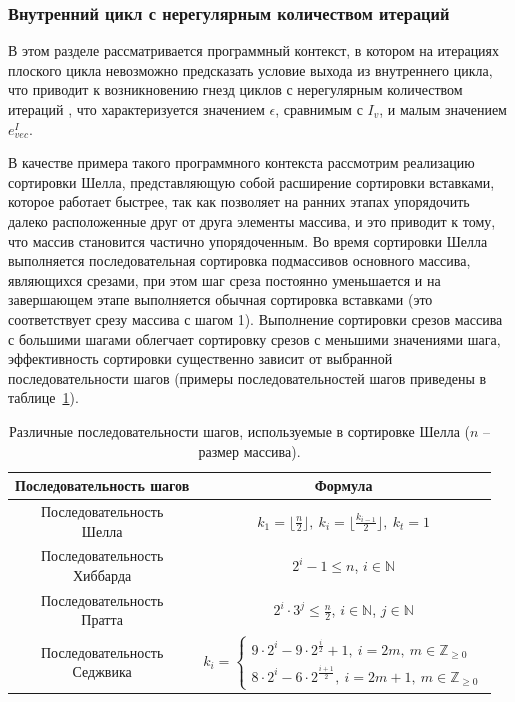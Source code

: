 \newpage
\subsubsection{Внутренний цикл с нерегулярным количеством итераций}\label{sec:text_4_vec_irreg}

В этом разделе рассматривается программный контекст, в котором на итерациях плоского цикла невозможно предсказать условие выхода из внутреннего цикла, что приводит к возникновению гнезд циклов с нерегулярным количеством итераций \cite{Rybakov2019VecIrr,Shabanov2019VecSci}, что характеризуется значением $\epsilon$, сравнимым с $I_v$, и малым значением $e_{vec}^I$.

В качестве примера такого программного контекста рассмотрим реализацию сортировки Шелла, представляющую собой расширение сортировки вставками, которое работает быстрее, так как позволяет на ранних этапах упорядочить далеко расположенные друг от друга элементы массива, и это приводит к тому, что массив становится частично упорядоченным.
Во время сортировки Шелла выполняется последовательная сортировка подмассивов основного массива, являющихся срезами, при этом шаг среза постоянно уменьшается и на завершающем этапе выполняется обычная сортировка вставками (это соответствует срезу массива с шагом 1).
Выполнение сортировки срезов массива с большими шагами облегчает сортировку срезов с меньшими значениями шага, эффективность сортировки существенно зависит от выбранной последовательности шагов (примеры последовательностей шагов приведены в таблице~\ref{tbl:text_4_vec_irreg_steps}).

\begin{table}[h!]
\centering
\singlespacing
{}\caption{Различные последовательности шагов, используемые в сортировке Шелла ($n$ -- размер массива).}
\bigskip
\label{tbl:text_4_vec_irreg_steps}
\begin{tabular}{ | c | c | }
  \hline
  Последовательность шагов & Формула \\ \hline\hline
  \makecell{Последовательность \\ Шелла}    & $k_1 = \lfloor \frac{n}{2} \rfloor, \ k_i = \lfloor \frac{k_{i-1}}{2} \rfloor, \ k_t = 1$ \\ \hline
  \makecell{Последовательность \\ Хиббарда} & $2^i - 1 \le n$, $i \in \mathbb{N}$ \\ \hline
  \makecell{Последовательность \\ Пратта}   & $2^i \cdot 3^j \le \frac{n}{2}$, $i \in \mathbb{N}$, $j \in \mathbb{N}$ \\ \hline
  \makecell{Последовательность \\ Седжвика} & $k_i = \begin{cases} 9 \cdot 2^i - 9 \cdot 2^{\frac{i}{2}} + 1, \ i = 2m, \ m \in \mathbb{Z}_{\ge 0} \\ 8 \cdot 2^i - 6 \cdot 2^{\frac{i + 1}{2}}, \ i = 2m + 1, \ m \in \mathbb{Z}_{\ge 0} \end{cases}$ \\ \hline
\end{tabular}
\end{table}

